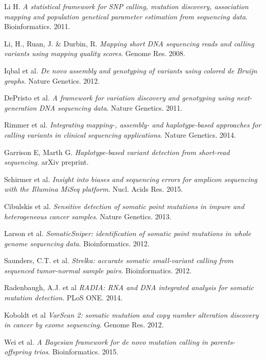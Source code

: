 \documentclass[notitlepage, twocolumn]{article}
\begin{document}
\begin{thebibliography}{9}

Li H. 
\textit{A statistical framework for SNP calling, mutation discovery, association mapping and population genetical parameter estimation from sequencing data}. 
Bioinformatics. 2011.

Li, H., Ruan, J. \& Durbin, R.
\textit{Mapping short DNA sequencing reads and calling
variants using mapping quality scores}. 
Genome Res. 2008.

Iqbal et al. 
\textit{De novo assembly and genotyping of variants using colored de Bruijn graphs}. 
Nature Genetics. 2012.

DePristo et al. 
\textit{A framework for variation discovery and genotyping using next-generation DNA sequencing data}. 
Nature Genetics. 2011.

Rimmer et al. 
\textit{Integrating mapping-, assembly- and haplotype-based approaches for calling variants in clinical sequencing applications}. 
Nature Genetics. 2014.

Garrison E, Marth G.
\textit{Haplotype-based variant detection from short-read sequencing}.
arXiv preprint.

Schirmer et al.
\textit{Insight into biases and sequencing errors for amplicon sequencing with the Illumina MiSeq platform}.
Nucl. Acids Res. 2015.

Cibulskis et al. 
\textit{Sensitive detection of somatic point mutations in impure and heterogeneous cancer samples}. 
Nature Genetics. 2013.

Larson et al. 
\textit{SomaticSniper: identification of somatic point mutations in whole genome sequencing data}. 
Bioinformatics. 2012.

Saunders, C.T. et al.
\textit{Strelka: accurate somatic small-variant calling from sequenced tumor-normal sample pairs}. 
Bioinformatics. 2012.

Radenbaugh, A.J. et al
\textit{RADIA: RNA and DNA integrated analysis for somatic mutation detection}. 
PLoS ONE. 2014.

Koboldt et al
\textit{VarScan 2: somatic mutation and copy number alteration discovery in cancer by exome sequencing}. 
Genome Res. 2012.

Wei et al.
\textit{A Bayesian framework for de novo mutation calling in parents-offspring trios}.
Bioinformatics. 2015.


\end{thebibliography}
\end{document}
